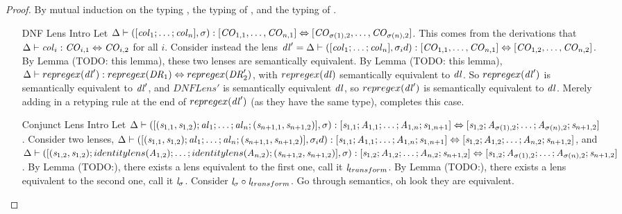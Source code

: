 \dnfls*
\begin{proof}
By mutual induction on the typing \DNFLens{}, the typing of \ConjunctLens{}, and the typing of \AtomLens{}.
\begin{enumerate}
\item[DNF Lens Intro] Let $\Delta \vdash ([\mathit{col}_1 ; \ldots ; \mathit{col}_n],\sigma) : [\mathit{CO}_{1,1}, \ldots, \mathit{CO}_{n,1}] \Leftrightarrow [\mathit{CO}_{\sigma(1),2}, \ldots, \mathit{CO}_{\sigma(n),2}]$.
This comes from the derivations that $\Delta \vdash \mathit{col}_i : \mathit{CO}_{i,1} \Leftrightarrow \mathit{CO}_{i,2}$ for all $i$.
Consider instead the lens $\mathit{dl}' = \Delta \vdash ([\mathit{col}_1 ; \ldots ; \mathit{col}_n],\sigma_id) : [\mathit{CO}_{1,1}, \ldots, \mathit{CO}_{n,1}] \Leftrightarrow[\mathit{CO}_{1,2}, \ldots, \mathit{CO}_{n,2}]$.
By Lemma (TODO: this lemma), these two lenses are semantically equivalent.
By Lemma (TODO: this lemma), $\Delta \vdash repregex(\mathit{dl}') : repregex(\mathit{DR}_1) \Leftrightarrow repregex(\mathit{DR}_2')$, with $repregex(\mathit{dl})$ semantically equivalent to $\mathit{dl}$.
So $repregex(\mathit{dl}')$ is semantically equivalent to $\mathit{dl}'$, and $DNFLens'$ is semantically equivalent $\mathit{dl}$, so $repregex(\mathit{dl}')$ is
semantically equivalent to $\mathit{dl}$.  Merely adding in a retyping rule at
the end of $repregex(\mathit{dl}')$ (as they have the same type), completes this case.
\item[Conjunct Lens Intro] Let $\Delta \vdash ([(\mathit{s}_{1,1},\mathit{s}_{1,2}) ; \mathit{al}_1 ; \ldots ; \mathit{al}_n ; (\mathit{s}_{n+1,1},\mathit{s}_{n+1,2})],\sigma) : [\mathit{s}_{1,1};\mathit{A}_{1,1}; \ldots ; \mathit{A}_{1,n} ; \mathit{s}_{1,n+1}] \Leftrightarrow [\mathit{s}_{1,2};\mathit{A}_{\sigma(1),2}; \ldots ; \mathit{A}_{\sigma(n),2} ; \mathit{s}_{n+1,2}]$.
Consider two lenses, $\Delta \vdash ([(\mathit{s}_{1,1},\mathit{s}_{1,2}) ; \mathit{al}_1 ; \ldots ; \mathit{al}_n ; (\mathit{s}_{n+1,1},\mathit{s}_{n+1,2})],\sigma_id) : [\mathit{s}_{1,1};\mathit{A}_{1,1}; \ldots ; \mathit{A}_{1,n} ; \mathit{s}_{1,n+1}] \Leftrightarrow [\mathit{s}_{1,2};\mathit{A}_{1,2}; \ldots ; \mathit{A}_{n,2} ; \mathit{s}_{n+1,2}]$,
and $\Delta \vdash ([(\mathit{s}_{1,2},\mathit{s}_{1,2});identitylens(\mathit{A}_{1,2}); \ldots ; identitylens(\mathit{A}_{n,2}) ; (\mathit{s}_{n+1,2},\mathit{s}_{n+1,2})],\sigma) : [\mathit{s}_{1,2};\mathit{A}_{1,2}; \ldots ; \mathit{A}_{n,2} ; \mathit{s}_{n+1,2}] \Leftrightarrow [\mathit{s}_{1,2};\mathit{A}_{\sigma(1),2}; \ldots ; \mathit{A}_{\sigma(n),2} ; \mathit{s}_{n+1,2}]$.
By Lemma (TODO:), there exists a lens equivalent to the first one, call it $\mathit{l}_{transform}$.
By Lemma (TODO:), there exists a lens equivalent to the second one, call it $\mathit{l}_{\sigma}$.
Consider $\mathit{l}_{\sigma} \circ \mathit{l}_{transform}$.  Go through semantics, oh look they are equivalent.

\end{enumerate}
\end{proof}

